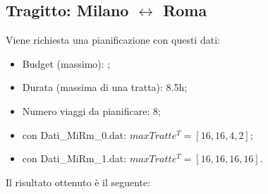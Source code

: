 \documentclass[main.tex]{subfiles}
\begin{document}
\subsection*{Tragitto: Milano $\leftrightarrow$ Roma}
Viene richiesta una pianificazione con questi dati:
\begin{itemize}
    \item Budget (massimo): ;
    \item Durata (massima di una tratta): 8.5h;
    \item Numero viaggi da pianificare: 8;
    \item con Dati\_MiRm\_0.dat: $maxTratte^T = [16,16,4,2]$;
    \item con Dati\_MiRm\_1.dat: $maxTratte^T = [16,16,16,16]$.
\end{itemize}
Il risultato ottenuto è il seguente:
\end{document}
